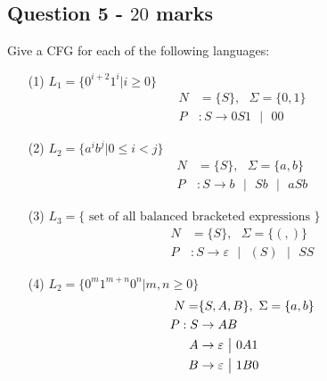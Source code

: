 \documentclass[12pt]{article}
\begin{document}
\subsection*{Question 5 - $20$ marks}
Give a CFG for each of the following languages:
\begin{enumerate}
\item[(1)] $L_1 = \{ 0^{i+2}1^i | i \geq 0 \}$
\begin{align*}
N &= \{S\}, \text{ } \Sigma = \{0,1\} \\
P&: S\rightarrow 0S1\text{ }\big|\text{ }00
\end{align*}
\item[(2)] $L_2 = \{ a^ib^j | 0 \leq i < j \}$
\begin{align*}
N &= \{S\}, \text{ } \Sigma = \{a,b\} \\
P&: S\rightarrow b\text{ }\big|\text{ }Sb\text{ }\big|\text{ }aSb
\end{align*}
\item[(3)] $L_3 = \{\text{ set of all balanced bracketed expressions }\}$
\begin{align*}
N &= \{S\}, \text{ } \Sigma = \{(,)\} \\
P&: S\rightarrow \varepsilon\text{ }\big|\text{ }(S)\text{ }\big|\text{ }SS
\end{align*}
\item[(4)] $L_2 = \{ 0^m1^{m+n}0^n | m,n \geq 0 \}$
\begin{align*}
N = &\{S,A,B\}, \text{ } \Sigma = \{a,b\} \\
P: S&\rightarrow AB \\
A &\rightarrow \varepsilon \text{ }\big{|}\text{ } 0A1 \\
B &\rightarrow \varepsilon \text{ }\big{|}\text{ } 1B0
\end{align*}
\end{enumerate}

\PutEnd
\end{document}
